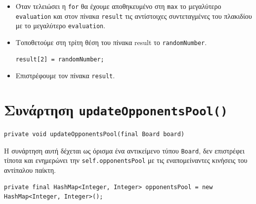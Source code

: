 \begin{itemize}
\item \begin{sloppypar}Όταν τελειώσει η \lstinline!for! θα έχουμε αποθηκευμένο στη \lstinline!max! το μεγαλύτερο \lstinline!evaluation! και στον πίνακα \lstinline!result! τις
αντίστοιχες συντεταγμένες του πλακιδίου με το μεγαλύτερο \lstinline!evaluation!.\end{sloppypar}

\item Τοποθετούμε στη τρίτη θέση του πίνακα result το \lstinline!randomNumber!.
\begin{lstlisting}[breaklines=true, numbers=none, aboveskip=\smallskipamount, belowskip=\smallskipamount, captionpos=none]
result[2] = randomNumber;
\end{lstlisting}

\item Επιστρέφουμε τον πίνακα \lstinline!result!.
\end{itemize}

\section{Συνάρτηση \texttt{updateOpponentsPool()}} \label{sec:updateOpponentsPool}
\begin{lstlisting}[numbers=none, title={Declaration της συνάρτησης}]
private void updateOpponentsPool(final Board board)
\end{lstlisting}
Η συνάρτηση αυτή δέχεται ως όρισμα ένα αντικείμενο τύπου \lstinline!Board!,
δεν επιστρέφει τίποτα και
ενημερώνει την \lstinline!self.opponentsPool! με τις εναπομείναντες κινήσεις του αντίπαλου παίκτη.
\begin{lstlisting}[numbers=none, breaklines=true, title={Declaration της \lstinline!opponentsPool!}]
private final HashMap<Integer, Integer> opponentsPool = new HashMap<Integer, Integer>();
\end{lstlisting}

